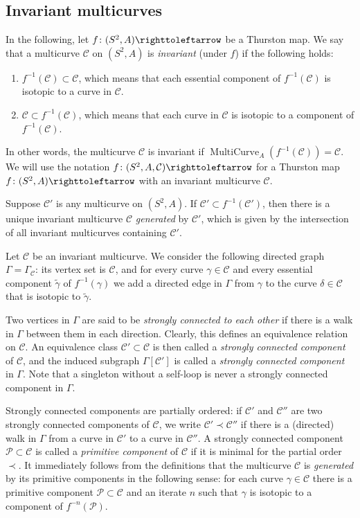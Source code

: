 \documentclass{amsart}
\theoremstyle{plain}
\theoremstyle{definition}
\theoremstyle{remark}
\newcommand{\CC}{{\mathcal C}}
\newcommand{\PC}{{\mathcal P}}
\newcommand{\MC}{{\operatorname{MultiCurve}}}
\newcommand\selfmap{\righttoleftarrow}
\begin{document}
\subsection{Invariant multicurves}
\label{ss: inv_multicurves}
In the following, let $f\colon (S^2,A)\selfmap$ be a Thurston map.  We say that a multicurve $\CC$ on $(S^2,A)$ is \emph{invariant} (under $f$) if the following holds:
\begin{enumerate}[label=\text{(\roman*)},font=\normalfont,leftmargin=*]
\item $f^{-1}(\CC)\subset \CC$,  which means that each essential component of $f^{-1}(\CC)$ is isotopic to a curve in $\CC$. 
\item $\CC\subset f^{-1}(\CC)$,  which means that each curve in $\CC$ is isotopic to a component of $f^{-1}(\CC)$.
\end{enumerate}
In other words, the multicurve $\CC$ is invariant if $\MC_A(f^{-1}(\CC))=\CC$.
We will use the notation $f\colon (S^2,A, \CC)\selfmap$ for a Thurston map  $f\colon (S^2,A)\selfmap$ with an invariant multicurve $\CC$. 

Suppose $\CC'$ is any multicurve on $(S^2,A)$.  If $\CC'\subset f^{-1}(\CC')$, then there is a unique invariant multicurve $\CC$ \emph{generated} by $\CC'$, which is given by the intersection of all invariant multicurves containing $\CC'$.

Let $\CC$ be an invariant multicurve. We consider the following directed graph $\Gamma=\Gamma_\CC$: its vertex set is $\CC$,  and for every curve $\gamma\in \CC$ and every essential component $\widetilde \gamma$ of $f^{-1}(\gamma)$ we add a directed edge in $\Gamma$ from $\gamma$ to the curve $\delta \in \CC$ that is isotopic to $\widetilde\gamma$.%

Two vertices in $\Gamma$ are said to be \emph{strongly connected to each other} if there is a walk in $\Gamma$ between them in each direction. Clearly, this defines an equivalence relation on $\CC$.  An equivalence class $\CC'\subset \CC$ is then called a \emph{strongly connected component} of $\CC$, and the induced subgraph $\Gamma[\CC']$ is called  a \emph{strongly connected component} in $\Gamma$. Note that a singleton without a self-loop is never a strongly connected component in $\Gamma$.


Strongly connected components are partially ordered: if $\CC'$ and $\CC''$ are two strongly connected components of $\CC$, we write $\CC'\prec\CC''$ if there is a (directed) walk in $\Gamma$ from a curve in $\CC'$ to a curve in $\CC''$.  A strongly connected component $\PC\subset \CC$ is called a \emph{primitive component} of $\CC$ if it is minimal for the partial order $\prec$.  It immediately follows from the definitions that the multicurve $\CC$ is \emph{generated} by its primitive components in the following sense: for each curve $\gamma\in \CC$ there is a primitive component $\PC\subset \CC$ and an iterate $n$ such that $\gamma$ is isotopic to a component of $f^{-n}(\PC)$.
\end{document}
